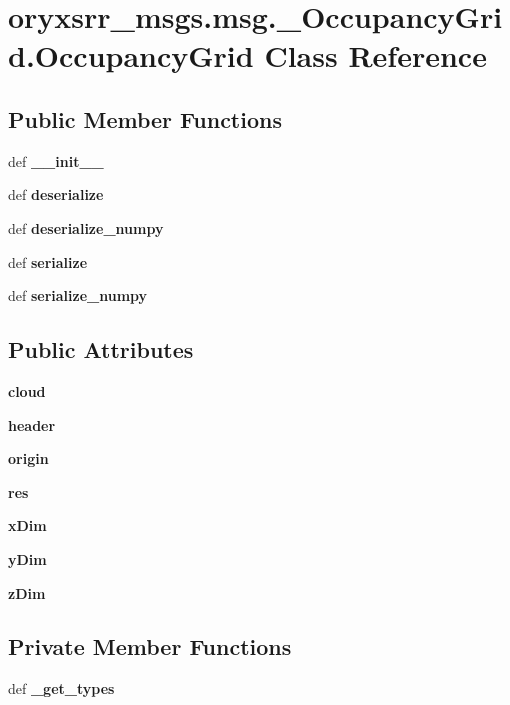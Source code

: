 \section{oryxsrr\-\_\-msgs.\-msg.\-\_\-\-Occupancy\-Grid.\-Occupancy\-Grid \-Class \-Reference}
\label{classoryxsrr__msgs_1_1msg_1_1__OccupancyGrid_1_1OccupancyGrid}
\subsection*{\-Public \-Member \-Functions}
\begin{DoxyCompactItemize}
\item 
def {\bf \-\_\-\-\_\-init\-\_\-\-\_\-}
\item 
def {\bf deserialize}
\item 
def {\bf deserialize\-\_\-numpy}
\item 
def {\bf serialize}
\item 
def {\bf serialize\-\_\-numpy}
\end{DoxyCompactItemize}
\subsection*{\-Public \-Attributes}
\begin{DoxyCompactItemize}
\item 
{\bf cloud}
\item 
{\bf header}
\item 
{\bf origin}
\item 
{\bf res}
\item 
{\bf x\-Dim}
\item 
{\bf y\-Dim}
\item 
{\bf z\-Dim}
\end{DoxyCompactItemize}
\subsection*{\-Private \-Member \-Functions}
\begin{DoxyCompactItemize}
\item 
def {\bf \-\_\-get\-\_\-types}
\end{DoxyCompactItemize}
